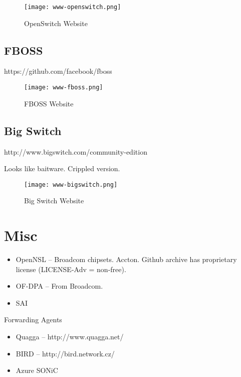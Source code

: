 \begin{figure}[h!]
\texttt{[image: www-openswitch.png]}
 \caption{OpenSwitch Website}
 \label{fig:www-openswitch}
\end{figure}


\subsection{FBOSS}

https://github.com/facebook/fboss

\begin{figure}[h!]
\texttt{[image: www-fboss.png]}
 \caption{FBOSS Website}
 \label{fig:www-fboss}
\end{figure}


\subsection{Big Switch}

http://www.bigswitch.com/community-edition

Looks like baitware. Crippled version.

\begin{figure}[h!]
\texttt{[image: www-bigswitch.png]}
 \caption{Big Switch Website}
 \label{fig:www-bigswitch}
\end{figure}


\section{Misc}

\begin{itemize}
 \item OpenNSL -- Broadcom chipsets. Accton. Github archive has proprietary
   license (LICENSE-Adv = non-free).
 \item OF-DPA -- From Broadcom.
 \item SAI 
\end{itemize}


Forwarding Agents
\begin{itemize}
 \item Quagga -- http://www.quagga.net/
 \item BIRD -- http://bird.network.cz/
 \item Azure SONiC
\end{itemize}


